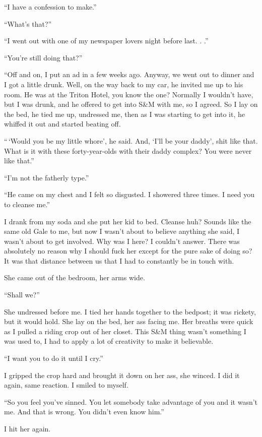``I have a confession to make.''

``What's that?''

``I went out with one of my newspaper lovers night before last. . .''

``You're still doing that?''

``Off and on, I put an ad in a few weeks ago. Anyway, we went out to
dinner and I got a little drunk. Well, on the way back to my car, he
invited me up to his room. He was at the Triton Hotel, you know the one?
Normally I wouldn't have, but I was drunk, and he offered to get into
S\&M with me, so I agreed. So I lay on the bed, he tied me up, undressed
me, then as I was starting to get into it, he whiffed it out and started
beating off.

``\,`Would you be my little whore', he said. And, `I'll be your daddy',
shit like that. What is it with these forty-year-olds with their daddy
complex? You were never like that.''

``I'm not the fatherly type.''

``He came on my chest and I felt so disgusted. I showered three times. I
need you to cleanse me.''

I drank from my soda and she put her kid to bed. Cleanse huh? Sounds
like the same old Gale to me, but now I wasn't about to believe anything
she said, I wasn't about to get involved. Why was I here? I couldn't
answer. There was absolutely no reason why I should fuck her except for
the pure sake of doing so? It was that distance between us that I had to
constantly be in touch with.

She came out of the bedroom, her arms wide.

``Shall we?''

She undressed before me. I tied her hands together to the bedpost; it
was rickety, but it would hold. She lay on the bed, her ass facing me.
Her breaths were quick as I pulled a riding crop out of her closet. This
S\&M thing wasn't something I was used to, I had to apply a lot of
creativity to make it believable.

``I want you to do it until I cry.''

I gripped the crop hard and brought it down on her ass, she winced. I
did it again, same reaction. I smiled to myself.

``So you feel you've sinned. You let somebody take advantage of you and
it wasn't me. And that is wrong. You didn't even know him.''

I hit her again.

